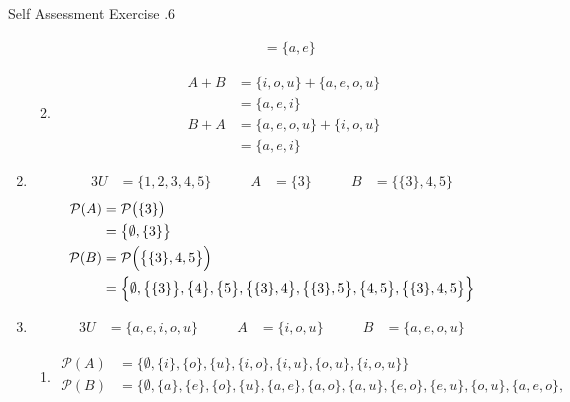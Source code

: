 \documentclass[../notes.tex]{subfiles}
\begin{document}
\begin{exercisebox}{Self Assessment Exercise \thechapter.6}
\begin{enumerate}
\begin{enumerate}[label=(\alph*)]
\begin{align*}
                  &= \{a, e\}
                \end{align*}
              \item \rule{0pt}{11pt} \vspace*{-25pt}
                \begin{align*}
                  A + B &= \{i, o, u\} + \{a, e, o, u\}\\
                  &= \{a, e, i\}\\
                  B + A &= \{a, e, o, u\} + \{i, o, u\}\\
                  &= \{a, e, i\}
                \end{align*}
            \end{enumerate}
          \item \rule{0pt}{11pt} \vspace*{-25pt}
            \begin{alignat*}{3}
              U &= \{1, 2, 3, 4, 5\} \qquad & A &= \{3\} \qquad & B &= \bigl\{\{3\}, 4, 5\bigr\}
            \end{alignat*}
            \begin{align*}
              \mathcal{P}(A) &= \mathcal{P}\bigl(\{3\}\bigr)\\
              &= \bigl\{\emptyset, \{3\}\bigr\}\\
              \mathcal{P}(B) &= \mathcal{P}\Bigl(\bigl\{\{3\}, 4, 5\bigr\}\Bigr)\\
              &= \Bigl\{\emptyset, \bigl\{\{3\}\bigr\}, \bigl\{4\bigr\}, \bigl\{5\bigr\}, \bigl\{\{3\}, 4\bigr\}, \bigl\{\{3\}, 5\bigr\}, \bigl\{4, 5\bigr\}, \bigl\{\{3\}, 4, 5\bigr\}\Bigr\}
            \end{align*}
          \item \rule{0pt}{11pt} \vspace*{-25pt}
            \begin{alignat*}{3}
              U &= \{a, e, i, o, u\} \qquad & A &= \{i, o, u\} \qquad & B &= \{a, e, o, u\}
            \end{alignat*}
            \begin{enumerate}[label=(\alph*)]
              \item \rule{0pt}{11pt} \vspace*{-25pt}
                \begin{align*}
                  \mathcal{P}(A) &= \bigl\{\emptyset, \{i\}, \{o\}, \{u\}, \{i, o\}, \{i, u\}, \{o, u\}, \{i, o, u\}\bigr\}\\
                  \mathcal{P}(B) &= \bigl\{\emptyset, \{a\}, \{e\}, \{o\}, \{u\}, \{a, e\}, \{a, o\}, \{a, u\}, \{e, o\}, \{e, u\}, \{o, u\}, \{a, e, o\},\\

\end{align*}
\end{enumerate}
\end{enumerate}
\end{exercisebox}
\end{document}
